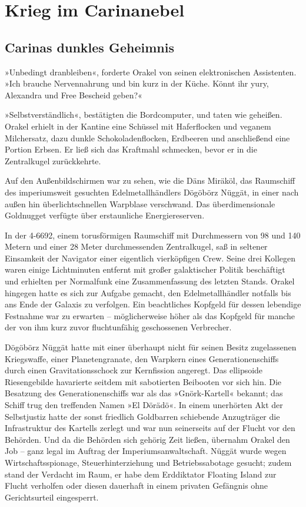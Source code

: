 \part{Krieg im Carinanebel}

\chapter{Carinas dunkles Geheimnis}

»Unbedingt dranbleiben«, forderte Orakel von seinen elektronischen Assistenten. »Ich brauche Nervennahrung und bin kurz in der Küche. Könnt ihr yury, Alexandra und Free Bescheid geben?«

»Selbstverständlich«, bestätigten die Bordcomputer, und taten wie geheißen. Orakel erhielt in der Kantine eine Schüssel mit Haferflocken und veganem Milchersatz, dazu dunkle Schokoladenflocken, Erdbeeren und anschließend eine Portion Erbsen. Er ließ sich das Kraftmahl schmecken, bevor er in die Zentralkugel zurückkehrte.

Auf den Außenbildschirmen war zu sehen, wie die Däns Miräköl, das Raumschiff des imperiumsweit gesuchten Edelmetallhändlers Dögöbörz Nüggät, in einer nach außen hin überlichtschnellen Warpblase verschwand. Das überdimensionale Goldnugget verfügte über erstaunliche Energiereserven.

In der 4-6692, einem torusförmigen Raumschiff mit Durchmessern von 98 und 140 Metern und einer 28 Meter durchmessenden Zentralkugel, saß in seltener Einsamkeit der Navigator einer eigentlich vierköpfigen Crew. Seine drei Kollegen waren einige Lichtminuten entfernt mit großer galaktischer Politik beschäftigt und erhielten per Normalfunk eine Zusammenfassung des letzten Stands. Orakel hingegen hatte es sich zur Aufgabe gemacht, den Edelmetallhändler notfalls bis ans Ende der Galaxis zu verfolgen. Ein beachtliches Kopfgeld für dessen lebendige Festnahme war zu erwarten – möglicherweise höher als das Kopfgeld für manche der von ihm kurz zuvor fluchtunfähig geschossenen Verbrecher.

Dögöbörz Nüggät hatte mit einer überhaupt nicht für seinen Besitz zugelassenen Kriegswaffe, einer Planetengranate, den Warpkern eines Generationenschiffs durch einen Gravitationsschock zur Kernfission angeregt. Das ellipsoide Riesengebilde havarierte seitdem mit sabotierten Beibooten vor sich hin. Die Besatzung des Generationenschiffs war als das »Gnörk-Kartell« bekannt; das Schiff trug den treffenden Namen »El Dörädö«. In einem unerhörten Akt der Selbstjustiz hatte der sonst friedlich Goldbarren schiebende Anzugträger die Infrastruktur des Kartells zerlegt und war nun seinerseits auf der Flucht vor den Behörden. Und da die Behörden sich gehörig Zeit ließen, übernahm Orakel den Job – ganz legal im Auftrag der Imperiumsanwaltschaft. Nüggät wurde wegen Wirtschaftsspionage, Steuerhinterziehung und Betriebssabotage gesucht; zudem stand der Verdacht im Raum, er habe dem Erddiktator Floating Island zur Flucht verholfen oder diesen dauerhaft in einem privaten Gefängnis ohne Gerichtsurteil eingesperrt.

